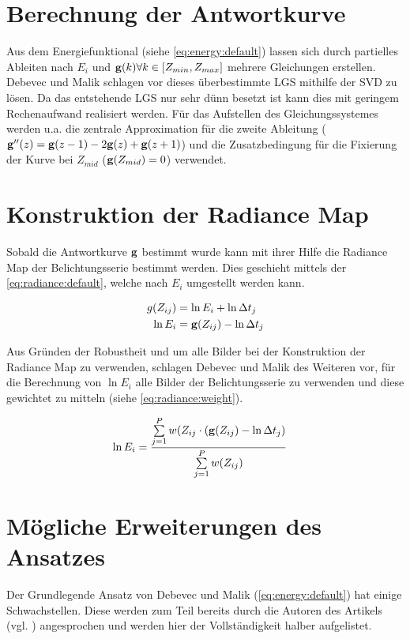 \section{Berechnung der Antwortkurve}
Aus dem Energiefunktional (siehe \autoref{eq:energy:default}) lassen sich durch partielles Ableiten nach $E_i$ und $\mathbf g(k) \forall k \in [Z_{min}, Z_{max}]$ mehrere Gleichungen erstellen. Debevec und Malik schlagen vor dieses überbestimmte \gls{LGS} mithilfe der \gls{SVD} zu lösen. Da das entstehende \gls{LGS} nur sehr dünn besetzt ist kann dies mit geringem Rechenaufwand realisiert werden. Für das Aufstellen des Gleichungssystemes werden u.a. die zentrale Approximation für die zweite Ableitung ($\mathbf{g}''(z) = \mathbf g(z-1)-2\mathbf g(z)+\mathbf g(z+1)$) und die Zusatzbedingung für die Fixierung der Kurve bei $Z_{mid}$ ($\mathbf g (Z_{mid}) = 0$) verwendet.


\section{Konstruktion der Radiance Map}
\label{sec:algo:radiance}
Sobald die Antwortkurve $\mathbf g$ bestimmt wurde kann mit ihrer Hilfe die \gls{Radiance Map} der Belichtungsserie bestimmt werden. Dies geschieht mittels der \autoref{eq:radiance:default}, welche nach $E_i$ umgestellt werden kann. 

\begin{align}
\label{eq:radiance:default}
g(Z_{ij}) &= \ln E_i + \ln \Delta t_j\\
\ln E_i &= \mathbf g(Z_{ij})-\ln \Delta t_j
\end{align}

Aus Gründen der Robustheit und um alle Bilder bei der Konstruktion der \gls{Radiance Map} zu verwenden, schlagen Debevec und Malik des Weiteren vor, für die Berechnung von $\ln E_i$ alle Bilder der Belichtungsserie zu verwenden und diese gewichtet zu mitteln (siehe \autoref{eq:radiance:weight}).


\begin{align}
\label{eq:radiance:weight}
\ln E_i &= \frac{\sum \limits_{j=1}^P w(Z_{ij} \cdot (\mathbf g(Z_{ij})-\ln \Delta t_j)}{\sum \limits_{j=1}^P w(Z_{ij})}
\end{align}

\section{Mögliche Erweiterungen des Ansatzes}
\label{algo:schwachstellen}
Der Grundlegende Ansatz von Debevec und Malik (\autoref{eq:energy:default}) hat einige Schwachstellen. Diese werden zum Teil bereits durch die Autoren des Artikels (vgl. \cite{paper}) angesprochen und werden hier der Vollständigkeit halber aufgelistet.

